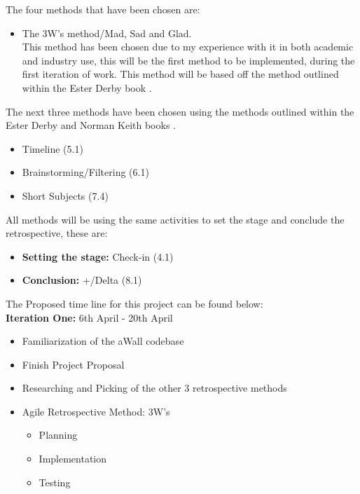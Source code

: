 \documentclass[11pt, a4paper, twoside, openright]{report}
\begin{document}
The four methods that have been chosen are: 

\begin{itemize}
\item The 3W's method/Mad, Sad and Glad. \\
This method has been chosen due to my experience with it in both academic and industry use, this will be the first method to be implemented, during the first iteration of work. This method will be based off the method outlined within the Ester Derby book \cite{AgileRetrospectivesEstherDerby}.
\end{itemize}
\noindent
The next three methods have been chosen using the methods outlined within the Ester Derby and Norman Keith books \cite{AgileRetrospectivesEstherDerby, normanKeith}.

\begin{itemize}
\item Timeline (5.1)
\item Brainstorming/Filtering (6.1)
\item Short Subjects (7.4)
\end{itemize}

All methods will be using the same activities to set the stage and conclude the retrospective, these are:
\begin{itemize}
\item \textbf{Setting the stage:} Check-in (4.1)
\item \textbf{Conclusion:} +/Delta (8.1)
\end{itemize}

\noindent
The Proposed time line for this project can be found below: \\

\noindent
\textbf{Iteration One:}  6th April - 20th April

\begin{itemize}
\item Familiarization of the aWall codebase
\item Finish Project Proposal
\item Researching and Picking of the other 3 retrospective methods
\item Agile Retrospective Method: 3W's
	\begin{itemize}
		\item Planning
        \item Implementation
        \item Testing
	\end{itemize}
\end{itemize}
\end{document}
